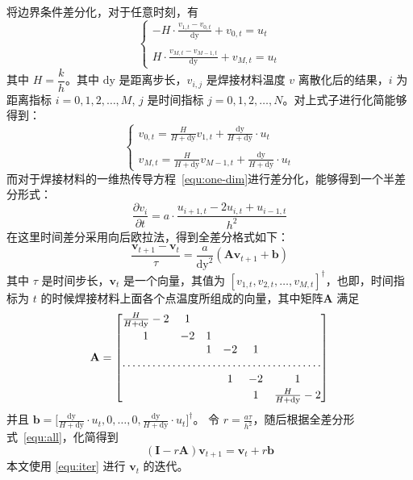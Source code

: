 \documentclass[../main.tex]{subfiles}
\begin{document}
将边界条件差分化，对于任意时刻，有
\begin{equation}
\begin{cases}
\displaystyle - H \cdot \frac{v _{1, t}  - v _{0, t}}{\mathrm{dy}} + v_{0 ,t} = u_{t} \\
\\
\displaystyle H \cdot\frac{v_{M , t} - v _{M-1, t}}{\mathrm{dy}} + v_{M,t} = u_{t}
\end{cases}
\end{equation}
其中 \(H = \dfrac{k}{h}\)。其中 \(\mathrm{dy}\) 是距离步长，\(v_{i,j}\) 是焊接材料温度 \(v\) 离散化后的结果，\(i\) 为距离指标 \(i = 0,  1,  2 , \dots , M\), \(j\) 是时间指标 \(j = 0 , 1 , 2 , \dots, N\)。对上式子进行化简能够得到：
\begin{equation}
\begin{cases}
\displaystyle v_{0,t} = \frac{H}{H + \mathrm{dy}} v_{1 ,t} + \frac{\mathrm{dy}}{H + \mathrm{dy}} \cdot u_{t}\\
\\
\displaystyle v_{M,t} = \frac{H}{H + \mathrm{dy}} v _{M-1, t} + \frac{\mathrm{dy}}{H + \mathrm{dy}} \cdot u_{t}
\end{cases}
\end{equation}
而对于焊接材料的一维热传导方程~\ref{equ:one-dim}进行差分化，能够得到一个半差分形式：
\begin{equation}
\frac{\partial v _{i}}{\partial t} = a \cdot \frac{u_{i+1, t} - 2 u_{i, t} + u_{i- 1 , t}}{h ^{2}}
\end{equation}
在这里时间差分采用向后欧拉法，得到全差分格式如下：
\begin{equation}\label{equ:all}
\frac{\mathbf{v}_{t+1}  - \mathbf{v}_{t}}{\tau}= \frac{a}{\mathrm{dy}^{2}} (\mathbf{A}\mathbf{v} _{t+1} + \mathbf{b})
\end{equation}
其中 \(\tau\) 是时间步长，\(\mathbf{v}_{t}\) 是一个向量，其值为 \([v _{1, t}, v_{2, t}, \dots, v_{M, t}]^{\dagger}\)，也即，时间指标为 \(t\) 的时候焊接材料上面各个点温度所组成的向量，其中矩阵\(\mathbf A\) 满足
\begin{equation}
\mathbf{A} = 
\begin{bmatrix}
\frac{H}{H + \mathrm{dy}} - 2 & 1 &&\\
\\[-10pt]
1 & -2 & 1 &\\
& & 1 & -2 & 1 \\
\hdotsfor{6}\\
\\[-10pt]
&& & 1 & -2 & 1 \\
\\[-10pt]
&& &  & 1 &\frac{H}{H + \mathrm{dy}} -2 
\end{bmatrix}
\end{equation}
并且 \(\mathbf{b} = \displaystyle \bigg[ \frac{\mathrm{dy}}{H + \mathrm{dy}} \cdot u_{t} , 0 ,\dots, 0 , \frac{\mathrm{dy}}{H + \mathrm{dy}} \cdot u_{t} \bigg] ^{\dagger}\)。
令 \(r = \displaystyle \frac{a \tau}{h ^{2}}\)，随后根据全差分形式~\ref{equ:all}，化简得到
\begin{equation}\label{equ:iter}
(\mathbf{I} - r\mathbf{A} ) \mathbf{v} _{t+1} = \mathbf{v}_{t} + r \mathbf{b}
\end{equation}
本文使用 \ref{equ:iter} 进行 \(\mathbf{v}_{t}\) 的迭代。
\end{document}
